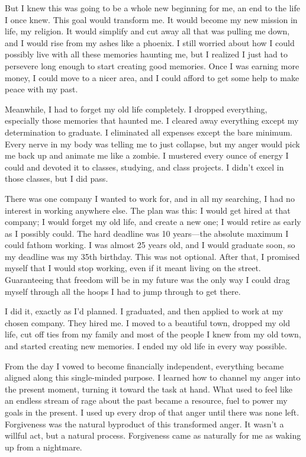 But I knew this was going to be a whole new beginning for me, an end to the life I once knew. This goal would transform me. It would become my new mission in life, my religion. It would simplify and cut away all that was pulling me down, and I would rise from my ashes like a phoenix. I still worried about how I could possibly live with all these memories haunting me, but I realized I just had to persevere long enough to start creating good memories. Once I was earning more money, I could move to a nicer area, and I could afford to get some help to make peace with my past.

Meanwhile, I had to forget my old life completely. I dropped everything, especially those memories that haunted me. I cleared away everything except my determination to graduate. I eliminated all expenses except the bare minimum. Every nerve in my body was telling me to just collapse, but my anger would pick me back up and animate me like a zombie. I mustered every ounce of energy I could and devoted it to classes, studying, and class projects. I didn't excel in those classes, but I did pass.

There was one company I wanted to work for, and in all my searching, I had no interest in working anywhere else. The plan was this: I would get hired at that company; I would forget my old life, and create a new one; I would retire as early as I possibly could. The hard deadline was 10 years---the absolute maximum I could fathom working. I was almost 25 years old, and I would graduate soon, so my deadline was my 35th birthday. This was not optional. After that, I promised myself that I would stop working, even if it meant living on the street. Guaranteeing that freedom will be in my future was the only way I could drag myself through all the hoops I had to jump through to get there.

I did it, exactly as I'd planned. I graduated, and then applied to work at my chosen company. They hired me. I moved to a beautiful town, dropped my old life, cut off ties from my family and most of the people I knew from my old town, and started creating new memories. I ended my old life in every way possible.

From the day I vowed to become financially independent, everything became aligned along this single-minded purpose. I learned how to channel my anger into the present moment, turning it toward the task at hand. What used to feel like an endless stream of rage about the past became a resource, fuel to power my goals in the present. I used up every drop of that anger until there was none left. Forgiveness was the natural byproduct of this transformed anger. It wasn't a willful act, but a natural process. Forgiveness came as naturally for me as waking up from a nightmare.


